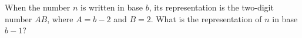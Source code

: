 When the number $n$ is written in base $b$, its representation is the two-digit number $AB$, where $A=b-2$ and $B=2$. What is the representation of $n$ in base $b-1$?
